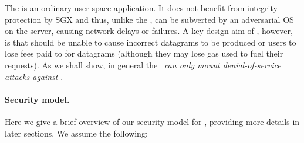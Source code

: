 The \medname is an ordinary user-space application. It does not benefit from integrity protection by SGX and thus, unlike the \encname, can be subverted by an adversarial OS on the \tc server, causing network delays or failures. A key design aim of \tc, however, is that \medname should be unable to cause incorrect datagrams to be produced or users to lose fees paid to \tc for datagrams (although they may lose gas used to fuel their requests). As we shall show, in general the \medname~{\em can only mount denial-of-service attacks against \tc}. 

\paragraph{Security model.}
Here we give a brief overview of our security model for \tc, providing more details in later sections. We assume the following:

